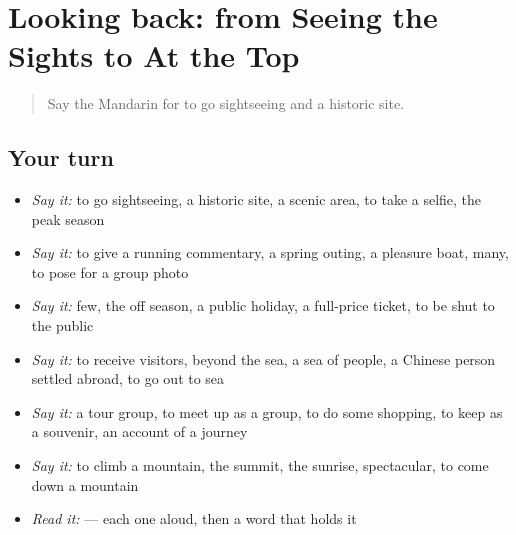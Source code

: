 \section[(dialogue)]{Looking back: from Seeing the Sights to At the Top}

\label{lesson:ZH-R435-review-430-435}



\begin{quote}
Say the Mandarin for to go sightseeing and a historic site.
\end{quote}

\subsection*{Your turn}
\begin{itemize}
\raggedright
  \item \emph{Say it:} to go sightseeing, a historic site, a scenic area, to take a selfie, the peak season
  \item \emph{Say it:} to give a running commentary, a spring outing, a pleasure boat, many, to pose for a group photo
  \item \emph{Say it:} few, the off season, a public holiday, a full-price ticket, to be shut to the public
  \item \emph{Say it:} to receive visitors, beyond the sea, a sea of people, a Chinese person settled abroad, to go out to sea
  \item \emph{Say it:} a tour group, to meet up as a group, to do some shopping, to keep as a souvenir, an account of a journey
  \item \emph{Say it:} to climb a mountain, the summit, the sunrise, spectacular, to come down a mountain
  \item \emph{Read it:}   — each one aloud, then a word that holds it
\end{itemize}

